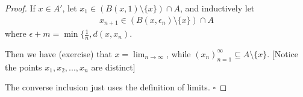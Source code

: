 \documentclass[11pt, oneside]{book}
\theoremstyle{break}
\newtheorem*{proof}{Proof}
\newcommand{\qed}{\hfill\ensuremath{\square}}	%
\begin{document}
\begin{proof}
	If $x \in A'$, let $x_1 \in \left( B(x, 1)\setminus\{x\} \right) \cap A$, and inductively let
	\begin{gather*}
		x_{n + 1} \in \left( B (x, \epsilon_n) \setminus \{x\} \right) \cap A
	\end{gather*}
	where $\epsilon+m = \min\{\frac{1}{n}, d(x, x_n)$.

	Then we have (exercise) that $x = \lim_{n \to \infty}$, while $(x_n)_{n = 1}^\infty \subseteq A \setminus \{x\}$. [Notice the points $x_1, x_2, ..., x_n$ are distinct]

	The converse inclusion just uses the definition of limits. \qed
\end{proof}
\end{document}

